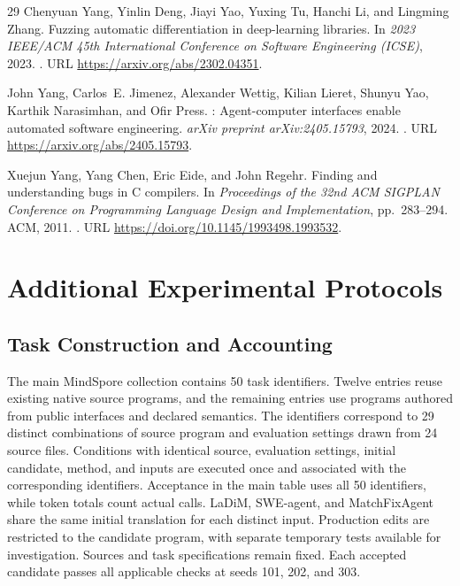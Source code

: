 \documentclass{article}
\begin{document}
\begin{thebibliography}{29}
Chenyuan Yang, Yinlin Deng, Jiayi Yao, Yuxing Tu, Hanchi Li, and Lingming
  Zhang.
\newblock Fuzzing automatic differentiation in deep-learning libraries.
\newblock In \emph{2023 IEEE/ACM 45th International Conference on Software
  Engineering (ICSE)}, 2023.
\newblock {}.
\newblock URL \url{https://arxiv.org/abs/2302.04351}.

John Yang, Carlos~E. Jimenez, Alexander Wettig, Kilian Lieret, Shunyu Yao,
  Karthik Narasimhan, and Ofir Press.
: Agent-computer interfaces enable automated software
  engineering.
\newblock \emph{arXiv preprint arXiv:2405.15793}, 2024.
\newblock {}.
\newblock URL \url{https://arxiv.org/abs/2405.15793}.

Xuejun Yang, Yang Chen, Eric Eide, and John Regehr.
\newblock Finding and understanding bugs in {C} compilers.
\newblock In \emph{Proceedings of the 32nd ACM SIGPLAN Conference on
  Programming Language Design and Implementation}, pp.\  283--294. ACM, 2011.
\newblock {}.
\newblock URL \url{https://doi.org/10.1145/1993498.1993532}.

\end{thebibliography}


\clearpage
\appendix

\section{Additional Experimental Protocols}
\label{sec:supplementary-protocols}

\subsection{Task Construction and Accounting}
\label{sec:task-construction}

The main MindSpore collection contains 50 task identifiers. Twelve entries reuse existing native source programs, and the remaining entries use programs authored from public interfaces and declared semantics. The identifiers correspond to 29 distinct combinations of source program and evaluation settings drawn from 24 source files. Conditions with identical source, evaluation settings, initial candidate, method, and inputs are executed once and associated with the corresponding identifiers. Acceptance in the main table uses all 50 identifiers, while token totals count actual calls. LaDiM, SWE-agent, and MatchFixAgent share the same initial translation for each distinct input. Production edits are restricted to the candidate program, with separate temporary tests available for investigation. Sources and task specifications remain fixed. Each accepted candidate passes all applicable checks at seeds 101, 202, and 303.
\end{document}
